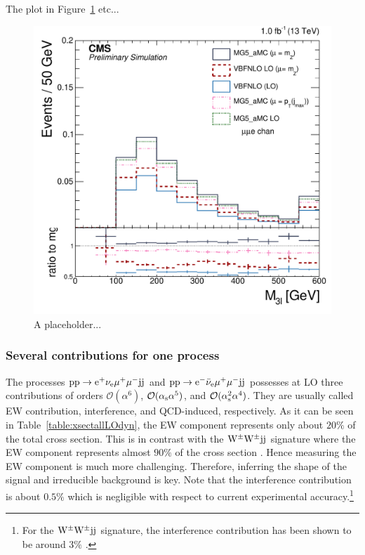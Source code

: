 \documentclass[11pt]{cernrep}
\begin{document}
The plot in Figure~\ref{vbs_fig1} etc... 

\begin{figure}[htbp]
\begin{center}
   \includegraphics[scale=0.65]{figs/3lmass.pdf}
\caption{A placeholder...}
\label{vbs_fig1}
\end{center}
\end{figure}

\subsubsection*{Several contributions for one process}

The processes ${\rm p} {\rm p} \to {\rm e}^+  \nu_{\rm e}  \mu^+ \mu^- {\rm j} {\rm j}$  and ${\rm p} {\rm p} \to {\rm e}^-  \bar \nu_{\rm e}  \mu^+ \mu^- {\rm j} {\rm j}$
possesses at LO three contributions of orders $\mathcal{O} (\alpha^6)$, $\mathcal{O} (\alpha_{\rm s}\alpha^5)$, and $\mathcal{O} (\alpha_{\rm s}^2\alpha^4)$.
They are usually called EW contribution, interference, and QCD-induced, respectively.
As it can be seen in Table~\ref{table:xsectallLOdyn}, the EW component represents only about $20\%$ of the total cross section.
This is in contrast with the ${\rm W}^\pm{\rm W}^\pm{\rm j}{\rm j}$ signature where the EW component represents almost $90\%$ of the cross section \cite{Biedermann:2017bss}.
Hence measuring the EW component is much more challenging.
Therefore, inferring the shape of the signal and irreducible background is key.
Note that the interference contribution is about $0.5\%$ which is negligible with respect to current experimental accuracy.\footnote{For the ${\rm W}^\pm{\rm W}^\pm{\rm j}{\rm j}$ signature, the interference contribution has been shown to be around $3\%$ \cite{Biedermann:2017bss}.}
\end{document}
